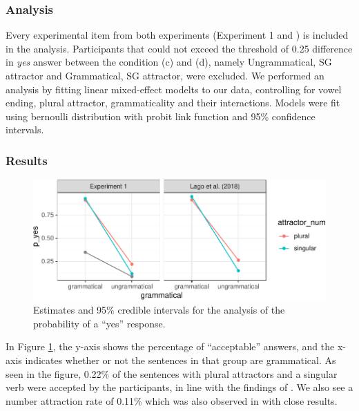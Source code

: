 \documentclass[doc]{apa6}
\begin{document}
\hypertarget{analysis}{%
\subsubsection{Analysis}\label{analysis}}

Every experimental item from both experiments (Experiment 1 and \textcite{Lago2018}) is included in the analysis. Participants that could not exceed the threshold of 0.25 difference in \emph{yes} answer between the condition (c) and (d), namely Ungrammatical, SG attractor and Grammatical, SG attractor, were excluded. We performed an analysis by fitting linear mixed-effect modelts to our data, controlling for vowel ending, plural attractor, grammaticality and their interactions. Models were fit using bernoulli distribution with probit link function and 95\% confidence intervals.

\hypertarget{results}{%
\subsubsection{Results}\label{results}}

\begin{figure}
\centering
\includegraphics{AgreementAttraction_files/figure-latex/exp1AvgResponse-1.pdf}
\caption{\label{fig:exp1AvgResponse}Estimates and 95\% credible intervals for the analysis of the probability of a \enquote{yes} response.}
\end{figure}

In Figure \ref{fig:exp1AvgResponse}, the y-axis shows the percentage of \enquote{acceptable} answers, and the x-axis indicates whether or not the sentences in that group are grammatical. As seen in the figure, 0.22\% of the sentences with plural attractors and a singular verb were accepted by the participants, in line with the findings of \textcite{Lago2018}. We also see a number attraction rate of 0.11\% which was also observed in \textcite{Lago2018} with close results.
\end{document}
